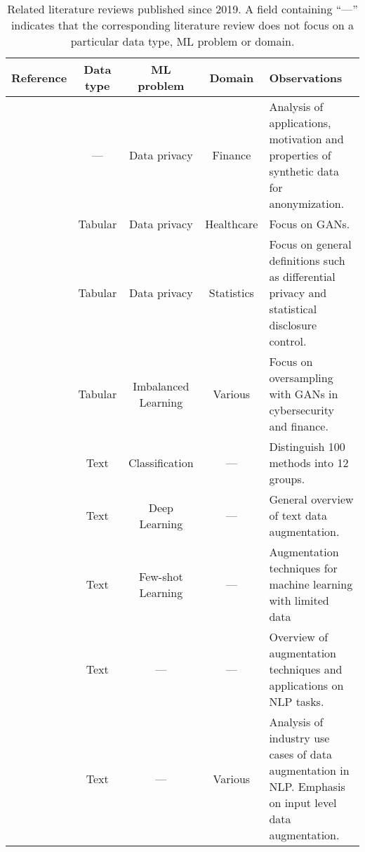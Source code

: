 \begingroup\small
\setlength\LTleft{-1.5cm}
\setlength\LTright{1.5cm}
\begin{table}[t!]
    \centering
    \caption{\label{tab:literature-reviews}
        Related literature reviews published since 2019. A field containing
        ``---'' indicates that the corresponding literature review does not
        focus on a particular data type, ML problem or domain.
    }
    \begin{tabularx}{\textwidth}{@{}rcccX@{}}
        \toprule
        Reference & Data type & ML problem & Domain & Observations \\
        \midrule

        \cite{assefa2020generating} & --- & Data privacy &
        Finance & Analysis of applications, motivation and properties of
        synthetic data for anonymization. \\

        \cite{hernandez2022synthetic} & Tabular & Data privacy &
        Healthcare & Focus on GANs. \\

        \cite{raghunathan2021synthetic} & Tabular & Data privacy &
        Statistics & Focus on general definitions such as differential privacy
        and statistical disclosure control.\\

        \cite{sauber2022use} & Tabular & Imbalanced Learning &
        Various & Focus on oversampling with GANs in cybersecurity
        and finance.\\

        \cite{bayer2021survey} & Text & Classification & --- & Distinguish
        100 methods into 12 groups. \\

        \cite{shorten2021text} & Text & Deep Learning & --- & General
        overview of text data augmentation. \\

        \cite{chen2021empirical} & Text & Few-shot Learning & --- &
        Augmentation techniques for machine learning with limited data\\

        \cite{feng2021survey} & Text & --- & --- & Overview of augmentation
        techniques and applications on NLP tasks.\\

        \cite{liu2020survey} & Text & --- & Various & Analysis of industry
        use cases of data augmentation in NLP\@. Emphasis on input level data
        augmentation.\\


\end{tabularx}
\end{table}
